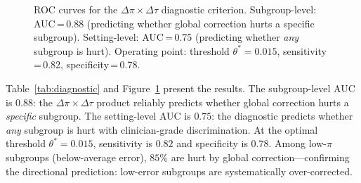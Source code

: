 \documentclass[11pt,twocolumn]{article}
\theoremstyle{remark}
\begin{document}
\begin{figure}[t]
\centering
{}
\caption{ROC curves for the $\Delta\pi \times \Delta\tau$ diagnostic criterion. Subgroup-level: AUC\,=\,0.88 (predicting whether global correction hurts a specific subgroup). Setting-level: AUC\,=\,0.75 (predicting whether \emph{any} subgroup is hurt). Operating point: threshold $\theta^*{=}0.015$, sensitivity\,=\,0.82, specificity\,=\,0.78.}
\label{fig:roc}
\end{figure}

Table~\ref{tab:diagnostic} and Figure~\ref{fig:roc} present the results.
The subgroup-level AUC is $0.88$: the $\Delta\pi \times \Delta\tau$ product reliably predicts whether global correction hurts a \emph{specific} subgroup.
The setting-level AUC is $0.75$: the diagnostic predicts whether \emph{any} subgroup is hurt with clinician-grade discrimination.
At the optimal threshold $\theta^* = 0.015$, sensitivity is $0.82$ and specificity is $0.78$.
Among low-$\pi$ subgroups (below-average error), $85\%$ are hurt by global correction---confirming the directional prediction: low-error subgroups are systematically over-corrected.
\end{document}

